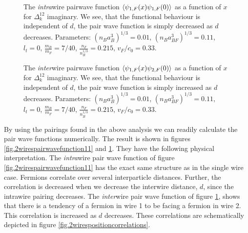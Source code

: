 \begin{figure} 
\begin{center}  
  
\caption{The \textit{intra}wire pairwave function $\braket{\psi_{1,F}(x)\psi_{1,F}(0)}$ as a function of $x$ for $\Delta^{12}_k$ imaginary. We see, that the functional behaviour is independent of $d$, the pair wave function is simply decreased as $d$ decreases. Parameters: $(n_Ba_B^3)^{1/3} = 0.01$, $(n_Ba_{BF}^3)^{1/3} = 0.11$, $l_t = 0$, $\frac{m_B}{m_F} = 7/40$, $\frac{n_F}{n_B^{1/3}} = 0.215$, $v_F/c_0 = 0.33$. }  
\label{fig.2wirespairwavefunction11}  
\vspace{0.5cm}
  
\caption{The \textit{inter}wire pairwave function $\braket{\psi_{1,F}(x)\psi_{2,F}(0)}$ as a function of $x$ for $\Delta^{12}_k$ imaginary. We see, that the functional behaviour is independent of $d$, the pair wave function is simply increased as $d$ decreases. Parameters: $(n_Ba_B^3)^{1/3} = 0.01$, $(n_Ba_{BF}^3)^{1/3} = 0.11$, $l_t = 0$, $\frac{m_B}{m_F} = 7/40$, $\frac{n_F}{n_B^{1/3}} = 0.215$, $v_F/c_0 = 0.33$. }  
\label{fig.2wirespairwavefunction12}  
\end{center}    
\end{figure}

By using the pairings found in the above analysis we can readily calculate the pair wave functions numerically. The result is shown in figures \ref{fig.2wirespairwavefunction11} and \ref{fig.2wirespairwavefunction12}. They have the following physical interpretation. The \textit{intra}wire pair wave function of figure \ref{fig.2wirespairwavefunction11} has the exact same structure as in the single wire case. Fermions correlate over several interparticle distances. Further, the correlation is decreased when we decrease the interwire distance, $d$, since the intrawire pairing decreases. The \textit{inter}wire pair wave function of figure \ref{fig.2wirespairwavefunction12}, shows that there is a tendency of a fermion in wire 1 to be facing a fermion in wire 2. This correlation is increased as $d$ decreases. These correlations are schematically depicted in figure \ref{fig.2wirespositioncorrelations}. 

